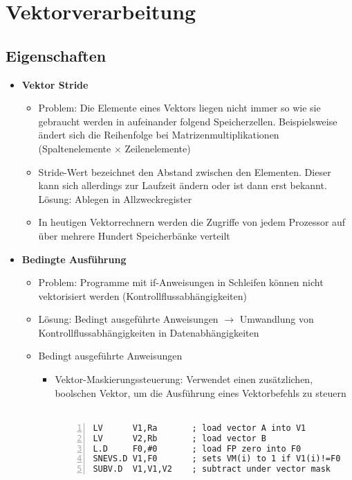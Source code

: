\section{Vektorverarbeitung}

\subsection{Eigenschaften}
\begin{itemize}
	\item \textbf{Vektor Stride}
	\begin{itemize}
		\item Problem: Die Elemente eines Vektors liegen nicht immer so wie sie gebraucht werden in aufeinander folgend Speicherzellen. Beispielsweise ändert sich die Reihenfolge bei Matrizenmultiplikationen (Spaltenelemente \(\times\) Zeilenelemente)
		\item Stride-Wert bezeichnet den Abstand zwischen den Elementen. Dieser kann sich allerdings zur Laufzeit ändern oder ist dann erst bekannt. Lösung: Ablegen in Allzweckregister
		\item In heutigen Vektorrechnern werden die Zugriffe von jedem Prozessor auf über mehrere Hundert Speicherbänke verteilt 
	\end{itemize}
	\item \textbf{Bedingte Ausführung}
	\begin{itemize}
		\item Problem: Programme mit if-Anweisungen in Schleifen können nicht vektorisiert werden (Kontrollflussabhängigkeiten)
		\item Lösung: Bedingt ausgeführte Anweisungen \(\rightarrow\) Umwandlung von Kontrollflussabhängigkeiten in Datenabhängigkeiten
		\item Bedingt ausgeführte Anweisungen
		\begin{itemize}
			\item Vektor-Maskierungssteuerung: Verwendet einen zusätzlichen, boolschen Vektor, um die Ausführung eines Vektorbefehls zu steuern\\\\
				\begin{minipage}{\linewidth}
				\begin{lstlisting}[frame=single,numbers=left,mathescape,language={[mips]Assembler},tabsize=4]
LV 		V1,Ra       ; load vector A into V1
LV 		V2,Rb       ; load vector B
L.D 	F0,#0       ; load FP zero into F0
SNEVS.D V1,F0    	; sets VM(i) to 1 if V1(i)!=F0
SUBV.D 	V1,V1,V2  	; subtract under vector mask

\end{lstlisting}
\end{minipage}
\end{itemize}
\end{itemize}
\end{itemize}

